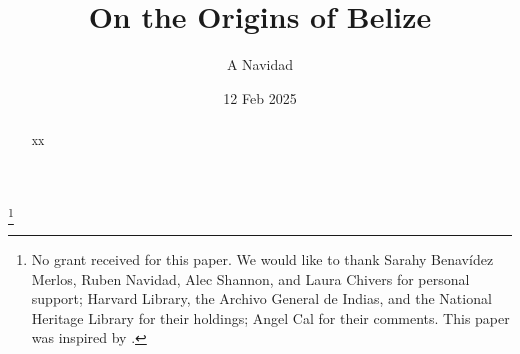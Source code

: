 \documentclass[draft]{amsart}
\theoremstyle{definition}
\theoremstyle{remark}
\begin{document}
%
%
\title{On the Origins of Belize}
\author{A Navidad}
\address{Harvard College, Cambridge, MA, US}
\date{12 Feb 2025}
\thanks{No grant received for this paper. We would like to thank Sarahy Benavídez Merlos, Ruben Navidad, Alec Shannon, and Laura Chivers for personal support; Harvard Library, the Archivo General de Indias, and the National Heritage Library for their holdings; Angel Cal for their comments. This paper was inspired by .} %
\begin{abstract}
xx
\end{abstract}
\maketitle
%
\end{document}
